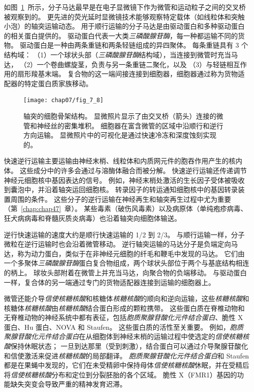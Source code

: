 如图~\ref{fig:7_8}~所示，分子马达最早是在电子显微镜下作为微管和运动粒子之间的交叉桥被观察到的。
更先进的荧光延时显微镜技术能够观察特定载体（如线粒体和突触小泡）的轴突运输动态。
用于顺行运输的分子马达是由驱动蛋白和多种驱动蛋白的相关蛋白提供的。
驱动蛋白代表一大类\textit{三磷酸腺苷酶}，每一种都运输不同的货物。
驱动蛋白是一种由两条重链和两条轻链组成的异四聚体。
每条重链具有 3 个结构域：
（1）一个球状头部（\textit{三磷酸腺苷酶}结构域），当连接到微管时充当马达，
（2）一个卷曲螺旋茎，负责与另一条重链二聚化，以及
（3）与轻链相互作用的扇形羧基末端。
复合物的这一端间接连接到细胞器，细胞器通过称为货物适配器的特定蛋白质家族移动。


\begin{figure}[htbp]
	\centering
	\texttt{[image: chap07/fig\_7\_8]}
	\caption{轴突的细胞骨架结构。
		显微照片显示了由交叉桥（箭头）连接的微管和神经丝的密集堆积。
		细胞器在富含微管的区域中沿顺行和逆行方向运输。
		显微照片中的可视化是通过快速冷冻和深度蚀刻实现的\cite{schnapp1982cytoplasmic}。}
	\label{fig:7_8}
\end{figure}


快速逆行运输主要运输由神经末梢、线粒体和内质网元件的胞吞作用产生的核内体。
这些成分中的许多会通过与溶酶体融合而被分解。
快速逆行运输还传递调节神经元细胞核中基因表达的信号。
例如，神经末梢处激活的生长因子受体被吸收到囊泡中，并沿着轴突运回细胞核。
转录因子的转运通知细胞核中的基因转录装置周围的条件。
这些分子的逆行运输在神经再生和轴突再生过程中尤为重要（第~\ref{chap:chap47}~章）。 
某些毒素（破伤风毒素）以及病原体（单纯疱疹病毒、狂犬病病毒和脊髓灰质炎病毒）也沿着轴突向细胞体输送。


逆行快速运输的速度大约是顺行快速运输的 1/2 到 2/3。
与顺行运输一样，分子微粒在逆行运输时也会沿着微管移动。
逆行轴突运输的马达分子是负端定向马达，称为动力蛋白，类似于在非神经元细胞的纤毛和鞭毛中发现的马达。 它们由一个多聚体\textit{三磷酸腺苷酶}蛋白复合物组成，两个球状头部位于两个与基底结构相连的柄上。
球妆头部附着在微管上并充当马达，向聚合物的负端移动。
与驱动蛋白一样，复合体的另一端通过专门的货物适配器连接到运输的细胞器上。


微管还能介导\textit{信使核糖核酸}和核糖体\textit{核糖核酸}的顺向和逆向运输，这些\textit{核糖核酸}和核糖体\textit{核糖核酸}由\textit{核糖核酸}结合蛋白形成的颗粒携带。
这些蛋白质在脊椎动物和无脊椎动物的神经系统中都有表征，包括\textit{胞质聚腺苷酸化元件结合蛋白}、脆性 X 蛋白、Hu 蛋白、NOVA 和 Staufen。
这些蛋白质的活性至关重要。
例如，\textit{胞质聚腺苷酸化元件结合蛋白}在从细胞体到神经末梢的运输过程中使选定的\textit{信使核糖核酸}保持休眠状态；
一旦到达那里（受到刺激），结合蛋白可以通过介导聚腺苷酸化和信使激活来促进\textit{核糖核酸}的局部翻译。
\textit{胞质聚腺苷酸化元件结合蛋白}和 Staufen 都是在果蝇中发现的，它们在未受精卵中保持母体\textit{信使核糖核酸}休眠，并在受精后将\textit{信使核糖核酸}分布和定位到分裂胚胎的各个区域。
脆性 X（FMR1）基因的功能缺失突变会导致严重的精神发育迟滞。


